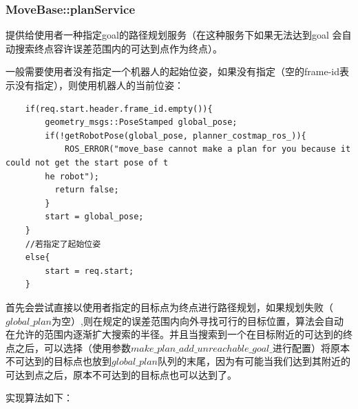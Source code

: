 \documentclass[9pt, oneside]{book}
\begin{document}
\subsubsection{MoveBase::planService}

提供给使用者一种指定goal的路径规划服务（在这种服务下如果无法达到goal 会自动搜索终点容许误差范围内的可达到点作为终点）。

一般需要使用者没有指定一个机器人的起始位姿，如果没有指定（空的frame-id表示没有指定），则使用机器人的当前位姿：

\footnotesize
\begin{verbatim}
    if(req.start.header.frame_id.empty()){
        geometry_msgs::PoseStamped global_pose;
        if(!getRobotPose(global_pose, planner_costmap_ros_)){
            ROS_ERROR("move_base cannot make a plan for you because it could not get the start pose of t
        he robot");
          return false;
        }
        start = global_pose;
    }
    //若指定了起始位姿
    else{ 
        start = req.start;
    }
\end{verbatim}
\normalsize

首先会尝试直接以使用者指定的目标点为终点进行路径规划，如果规划失败（$global\_plan$为空）,则在规定的误差范围内向外寻找可行的目标位置，算法会自动在允许的范围内逐渐扩大搜索的半径。并且当搜索到一个在目标附近的可达到的终点之后，可以选择（使用参数$make\_plan\_add\_unreachable\_goal\_$进行配置）将原本不可达到的目标点也放到$global\_plan$队列的末尾，因为有可能当我们达到其附近的可达到点之后，原本不可达到的目标点也可以达到了。

实现算法如下：
\end{document}
